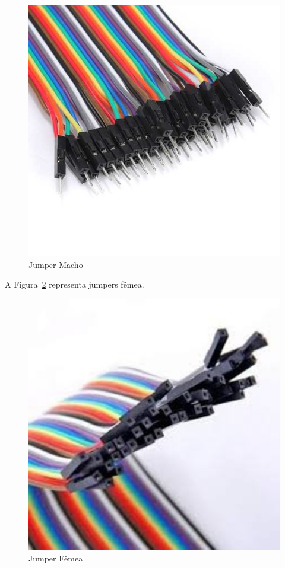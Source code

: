 \begin{figure}[H]
      \centering
      \includegraphics[scale=0.25]{figuras/jumperMachoo.jpg}
      \caption{Jumper Macho}
      \label{fig:Jmacho}
\end{figure}

A Figura~\ref{fig:Jfemea} representa jumpers fêmea.

\begin{figure}[H]
      \centering
      \includegraphics[scale=0.30]{figuras/Jfemea.jpg}
      \caption{Jumper Fêmea}
      \label{fig:Jfemea}
\end{figure}


